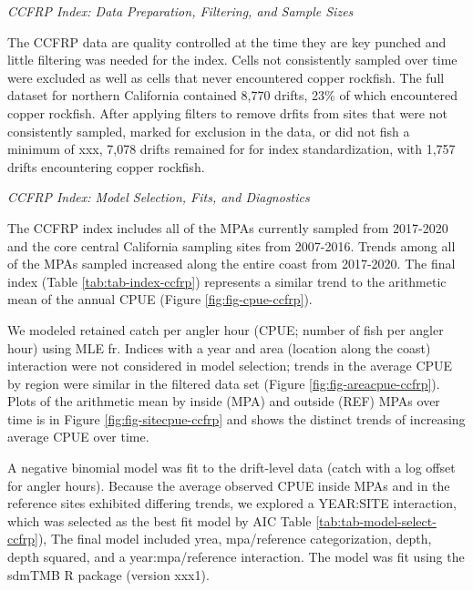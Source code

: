 \documentclass[11pt,
  english,
  letterpaper,
]{article}
\begin{document}
\emph{CCFRP Index: Data Preparation, Filtering, and Sample Sizes}

The CCFRP data are quality controlled at the time they are key punched and little filtering was needed for the index. Cells not consistently sampled over time were excluded as well as cells that never encountered copper rockfish. The full dataset for northern California contained 8,770 drifts, 23\% of which encountered copper rockfish. After applying filters to remove drfits from sites that were not consistently sampled, marked for exclusion in the data, or did not fish a minimum of xxx, 7,078 drifts remained for for index standardization, with 1,757 drifts encountering copper rockfish.

\emph{CCFRP Index: Model Selection, Fits, and Diagnostics}

The CCFRP index includes all of the MPAs currently sampled from 2017-2020 and the core central California sampling sites from 2007-2016. Trends among all of the MPAs sampled increased along the entire coast from 2017-2020. The final index (Table \ref{tab:tab-index-ccfrp}) represents a similar trend to the arithmetic mean of the annual CPUE (Figure \ref{fig:fig-cpue-ccfrp}).

We modeled retained catch per angler hour (CPUE; number of fish per angler hour) using MLE fr. Indices with a year and area (location along the coast) interaction were not considered in model selection; trends in the average CPUE by region were similar in the filtered data set (Figure \ref{fig:fig-areacpue-ccfrp}). Plots of the arithmetic mean by inside (MPA) and outside (REF) MPAs over time is in Figure \ref{fig:fig-sitecpue-ccfrp} and shows the distinct trends of increasing average CPUE over time.

A negative binomial model was fit to the drift-level data (catch with a log offset for angler hours). Because the average observed CPUE inside MPAs and in the reference sites exhibited differing trends, we explored a YEAR:SITE interaction, which was selected as the best fit model by AIC Table \ref{tab:tab-model-select-ccfrp}), The final model included yrea, mpa/reference categorization, depth, depth squared, and a year:mpa/reference interaction. The model was fit using the sdmTMB R package (version xxx1).
\end{document}
